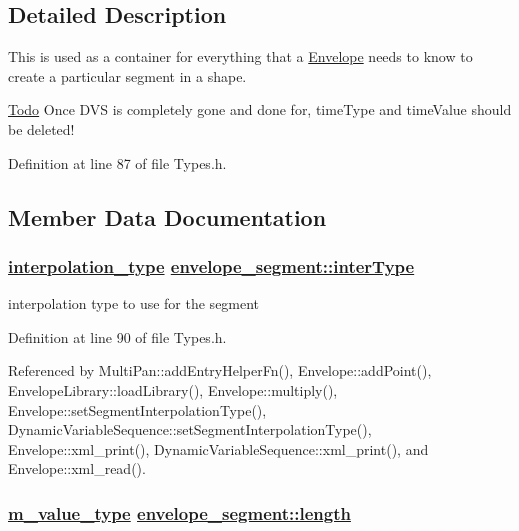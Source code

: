 \subsection{Detailed Description}
This is used as a container for everything that a \hyperlink{classEnvelope}{Envelope} needs to know to create a particular segment in a shape.

\begin{Desc}
\item[\hyperlink{todo__todo000002}{Todo}]Once DVS is completely gone and done for, time\-Type and time\-Value should be deleted! \end{Desc}




Definition at line 87 of file Types.h.

\subsection{Member Data Documentation}
\hypertarget{structenvelope__segment_o0}{
\subsubsection[interType]{\setlength{\rightskip}{0pt plus 5cm}\hyperlink{Types_8h_a13}{interpolation\_\-type} \hyperlink{structenvelope__segment_o0}{envelope\_\-segment::inter\-Type}}}
\label{structenvelope__segment_o0}


interpolation type to use for the segment 



Definition at line 90 of file Types.h.

Referenced by Multi\-Pan::add\-Entry\-Helper\-Fn(), Envelope::add\-Point(), Envelope\-Library::load\-Library(), Envelope::multiply(), Envelope::set\-Segment\-Interpolation\-Type(), Dynamic\-Variable\-Sequence::set\-Segment\-Interpolation\-Type(), Envelope::xml\_\-print(), Dynamic\-Variable\-Sequence::xml\_\-print(), and Envelope::xml\_\-read().\hypertarget{structenvelope__segment_o4}{
\subsubsection[length]{\setlength{\rightskip}{0pt plus 5cm}\hyperlink{Types_8h_a3}{m\_\-value\_\-type} \hyperlink{structenvelope__segment_o4}{envelope\_\-segment::length}}}
\label{structenvelope__segment_o4}


